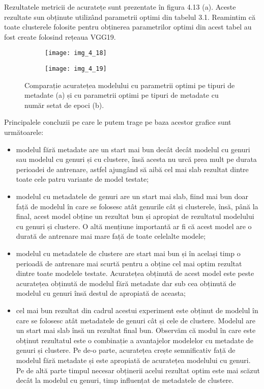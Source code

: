 Rezultatele metricii de acuratețe sunt prezentate în figura 4.13 (a). Aceste rezultate sun obținute utilizând parametrii optimi din tabelul 3.1. Reamintim că toate clusterele folosite pentru obținerea parametrilor optimi din acest tabel au fost create folosind rețeaua VGG19.
\begin{figure}[!h]
  \begin{subfigure}[b]{0.5\textwidth}
    \texttt{[image: img\_4\_18]}
    \caption{}
    \label{fig:f1}
  \end{subfigure}
  \hfill
  \begin{subfigure}[b]{0.5\textwidth}
    \texttt{[image: img\_4\_19]}
    \caption{}
    \label{fig:f2}
  \end{subfigure}
  \caption[Comparație acuratețea modelului cu parametrii optimi pe tipuri de metadate]{Comparație acuratețea modelului cu parametrii optimi pe tipuri de metadate (a) și cu parametrii optimi pe tipuri de metadate cu număr setat de epoci (b).}
\end{figure}
Principalele concluzii pe care le putem trage pe baza acestor grafice sunt următoarele:
\begin{itemize}
	\item modelul fără metadate are un start mai bun decât decât modelul cu genuri sau modelul cu genuri și cu clustere, însă acesta nu urcă prea mult pe durata perioadei de antrenare, astfel ajungând să aibă cel mai slab rezultat dintre toate cele patru variante de model testate;
	\item modelul cu metadatele de genuri are un start mai slab, fiind mai bun doar față de modelul în care se folosesc atât genurile cât și clusterele, însă, până la final, acest model obține un rezultat bun și apropiat de rezultatul modelului cu genuri și clustere. O altă mențiune importantă ar fi că acest model are o durată de antrenare mai mare față de toate celelalte modele;
	\item modelul cu metadatele de clustere are start mai bun și în același timp o perioadă de antrenare mai scurtă pentru a obține cel mai optim rezultat dintre toate modelele testate. Acuratețea obținută de acest model este peste acuratețea obținută de modelul fără metadate dar sub cea obținută de modelul cu genuri însă destul de apropiată de aceasta;
	\item cel mai bun rezultat din cadrul acestui experiment este obținut de modelul în care se folosesc atât metadatele de genuri cât și cele de clustere. Modelul are un start mai slab însă un rezultat final bun. Observăm că modul în care este obținut rezultatul este o combinație a avantajelor modelelor cu metadate de genuri și clustere. Pe de-o parte, acuratețea crește semnificativ față de modelul fără metadate și este apropiată de acuratețea modelului cu genuri. Pe de altă parte timpul necesar obținerii acelui rezultat optim este mai scăzut decât la modelul cu genuri, timp influențat de metadatele de clustere.
\end{itemize}

